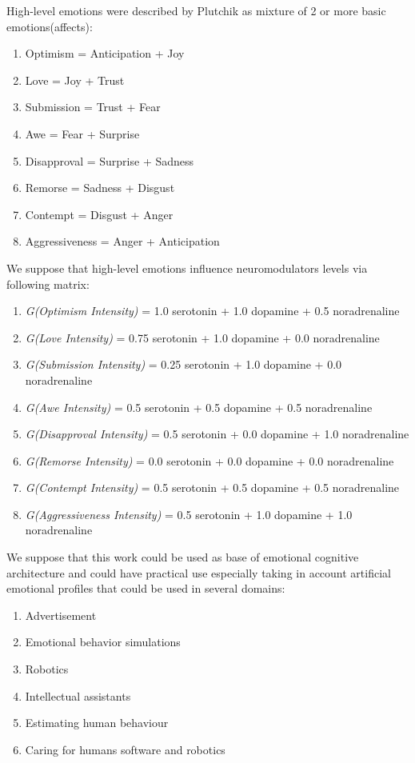 {{High-level emotions were described by Plutchik \cite{natureofemotions} as mixture of 2 or more basic emotions(affects):

\begin{enumerate}
\item  Optimism =	Anticipation + Joy
\item  Love =	Joy + Trust
\item  Submission = Trust + Fear
\item  Awe = Fear + Surprise
\item  Disapproval = Surprise + Sadness
\item  Remorse = Sadness + Disgust
\item  Contempt = Disgust + Anger
\item  Aggressiveness =	Anger + Anticipation
\end{enumerate}

We suppose that high-level emotions influence neuromodulators levels via following matrix:

\begin{enumerate}
\item  \emph{G(Optimism Intensity)} = 1.0 serotonin  + 1.0 dopamine + 0.5 noradrenaline
\item  \emph{G(Love Intensity)} = 0.75 serotonin + 1.0 dopamine + 0.0 noradrenaline
\item  \emph{G(Submission Intensity)} = 0.25 serotonin + 1.0 dopamine + 0.0 noradrenaline
\item  \emph{G(Awe Intensity)} = 0.5 serotonin + 0.5 dopamine + 0.5 noradrenaline
\item  \emph{G(Disapproval Intensity)} = 0.5 serotonin + 0.0 dopamine + 1.0 noradrenaline
\item  \emph{G(Remorse Intensity)} = 0.0 serotonin + 0.0 dopamine + 0.0 noradrenaline
\item  \emph{G(Contempt Intensity)} = 0.5 serotonin + 0.5 dopamine + 0.5 noradrenaline
\item  \emph{G(Aggressiveness Intensity)} = 0.5 serotonin + 1.0 dopamine + 1.0 noradrenaline
\end{enumerate}

We suppose that this work could be used as base of emotional cognitive architecture and could have practical use especially taking in account artificial emotional profiles that could be used in several domains:

\begin{enumerate}
\item  Advertisement
\item  Emotional behavior simulations
\item  Robotics
\item  Intellectual assistants
\item  Estimating human behaviour
\item  Caring for humans software and robotics
\end{enumerate}

}}
